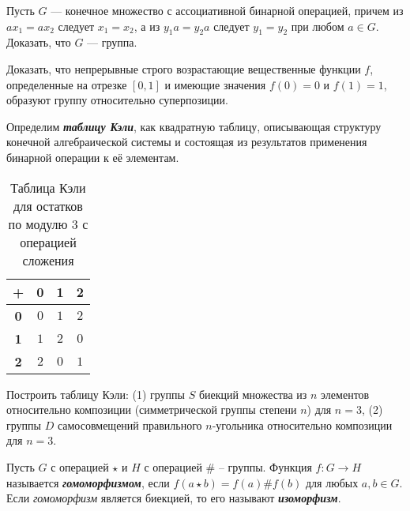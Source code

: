 \documentclass{article}
\begin{document}
\begin{task_boxed}
	Пусть $G$ — конечное множество с ассоциативной бинарной операцией, причем из $ax_1 = ax_2$ следует $x_1 = x_2$,
	а из $y_1a = y_2a$ следует $y_1 = y_2$ при любом $a \in G$. Доказать, что $G$ — группа.
\end{task_boxed}

\begin{task_boxed}
	Доказать, что непрерывные строго возрастающие вещественные функции $f$, определенные на отрезке $[0,1]$
	и имеющие значения $f(0) = 0$ и $f(1) = 1$, образуют группу относительно суперпозиции.
\end{task_boxed}

\begin{definition_boxed}

	Определим \textbf{\textit{таблицу Кэли}}, как квадратную таблицу, описывающая структуру конечной алгебраической системы и состоящая из результатов применения бинарной операции к её элементам. 
\end{definition_boxed}

\begin{example}
\begin{table}[h]\label{table-2} 
	\centering
	\begin{tabular}{|c|c|c|c|}
		\hline
		\textbf{+} & \textbf{0} & \textbf{1} & \textbf{2} \\\hline
		\textbf{0} & $0$ & $1$ & $2$ \\\hline
		\textbf{1} & $1$ & $2$ & $0$\\\hline
		\textbf{2} & $2$ & $0$ & $1$ \\\hline
	\end{tabular}
	\caption{Таблица Кэли для остатков по модулю 3 с операцией сложения}
\end{table}
\end{example}

\begin{task_boxed}
Построить таблицу Кэли:
(1) группы $S$ биекций множества из $n$ элементов относительно композиции (симметрической группы степени $n$) для $n = 3$,
(2) группы $D$ самосовмещений правильного $n$-угольника относительно композиции для $n = 3$.
\end{task_boxed}

\begin{definition_boxed}
	Пусть $G$ с операцией $\star$ и $H$ с операцией $\#$ – группы. Функция $f: G \to H$ называется \textbf{\textit{гомоморфизмом}}, если $f(a \star b) = f(a) \# f(b)$ для любых $a, b \in G$.\\
	Если \textit{гомоморфизм} является биекцией, то его называют \textbf{\textit{изоморфизм}}.
\end{definition_boxed}
\end{document}
